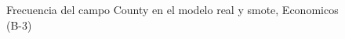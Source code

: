 \begin{figure}[H]
    \centering
    
    \caption{Frecuencia del campo County en el modelo real y smote, Economicos (B-3)}
    \label{frecuency-County-smote-enc}
\end{figure}